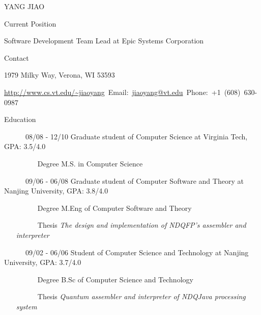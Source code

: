 \documentclass{article}
\begin{document}
\begin{cv}{YANG JIAO}
\begin{cvlist}{Current Position}
\item Software Development Team Lead at Epic Systems Corporation
\end{cvlist}
\begin{cvlist}{Contact}
\item 1979 Milky Way, Verona, WI 53593  
\item \url{http://www.cs.vt.edu/~jiaoyang}~Email:~\url{jiaoyang@vt.edu}~Phone:~+1~(608)~630-0987
\end{cvlist}
\begin{cvlist}{Education}
\item [~~~~~~08/08 - 12/10] Graduate student of Computer Science at Virginia Tech, GPA: 3.5/4.0
\begin{itemize}
\item [~~~~~~Degree] M.S. in Computer Science 
\end{itemize}
\item [~~~~~~09/06 - 06/08] Graduate student of Computer Software and Theory at Nanjing University, GPA: 3.8/4.0
\begin{itemize}
\item [~~~~~~Degree] M.Eng of Computer Software and Theory
\item [~~~~~~Thesis] {\em The design and implementation of NDQFP's assembler and interpreter}
\end{itemize}
\item [~~~~~~09/02 - 06/06] Student of Computer Science and Technology at Nanjing University, GPA: 3.7/4.0
\begin{itemize}
\item [~~~~~~Degree] B.Sc of Computer Science and Technology
\item [~~~~~~Thesis] {\em Quantum assembler and interpreter of NDQJava processing system}
\end{itemize}
\end{cvlist}


\end{cv}
\end{document}
